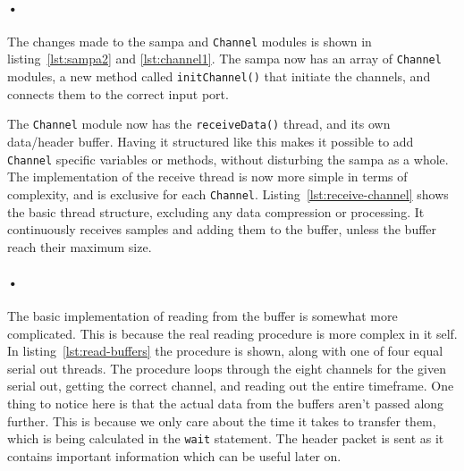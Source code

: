 \documentclass[a4paper, 12pt]{report}
\newcommand{\codeword}[1]{\texttt{#1}}
\begin{document}
\newpage




\paragraph{•}
The changes made to the \gls{sampa} and \codeword{Channel} modules is shown in listing~\ref{lst:sampa2} and \ref{lst:channel1}.
The \gls{sampa} now has an array of \codeword{Channel} modules, a new method called \codeword{initChannel()} that initiate the channels, and connects them to the correct input port.




The \codeword{Channel} module now has the \codeword{receiveData()} thread, and its own data/header buffer.
Having it structured like this makes it possible to add \codeword{Channel} specific variables or methods, without disturbing the \gls{sampa} as a whole.
The implementation of the receive thread is now more simple in terms of complexity, and is exclusive for each \codeword{Channel}.
Listing~\ref{lst:receive-channel} shows the basic thread structure, excluding any data compression or processing.
It continuously receives samples and adding them to the buffer, unless the buffer reach their maximum size.




\paragraph{•}
The basic implementation of reading from the buffer is somewhat more complicated.
This is because the real reading procedure is more complex in it self.
In listing~\ref{lst:read-buffers} the procedure is shown, along with one of four equal serial out threads.
The procedure loops through the eight channels for the given serial out, getting the correct channel, and reading out the entire timeframe.
One thing to notice here is that the actual data from the buffers aren't passed along further.
This is because we only care about the time it takes to transfer them, which is being calculated in the \codeword{wait} statement.
The header packet is sent as it contains important information which can be useful later on.
\end{document}
